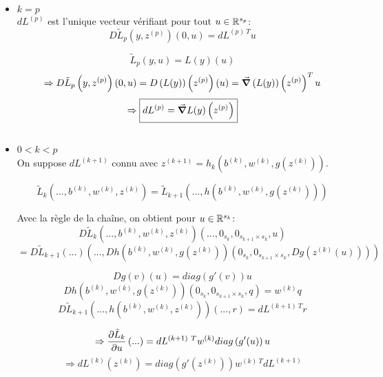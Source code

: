 	\begin{itemize}
		\item $k = p$\\
			$dL^{(p)}$ est l'unique vecteur vérifiant pour tout $u\in\mathbb{R}^{s_p}$:
			\[D\tilde{L}_p\left(y, z^{(p)}\right)(0, u) = dL^{(p)~T} u\]
			
			\[\tilde{L}_p(y, u) = L(y)(u)\]
			\[\Rightarrow D\tilde{L}_p\left(y, z^{(p)}\right)(0, u) 
				 = D\left(L(y)\right)\left(z^{(p)}\right)(u) 
				 = \grad{\left(L(y)\right)}\left(z^{(p)}\right)^T u\]
			\[\Rightarrow\boxed{dL^{(p)} = \grad{L(y)}\left(z^{(p)}\right)}\]
			
			\[\]
					
		\item $0 < k < p$\\
		On suppose $dL^{(k + 1)}$ connu avec $z^{(k+1)} = h_{k}\left(b^{(k)}, w^{(k)}, g(z^{(k)})\right)$.
		
		\[\tilde{L}_{k}\left(..., b^{(k)}, w^{(k)}, z^{(k)}\right) = \tilde{L}_{k+1}\left(..., h\left(b^{(k)}, w^{(k)}, g\left(z^{(k)}\right)\right)\right)\]
		\[\]
		
		Avec la règle de la chaîne, on obtient pour $u\in\mathbb{R}^{s_k}$:
		\[D\tilde{L}_{k}\left(
		                      ..., b^{(k)}, w^{(k)}, z^{(k)}
										\right)(..., 0_{s_k}, 0_{s_{k+1}\times s_k}, u)\] 
	  \[= D\tilde{L}_{k+1}\left(
		                        ...%
											\right)\left(
											             ..., Dh\left(
																	              b^{(k)}, w^{(k)}, g\left(z^{(k)}\right)
																					\right)
																					\left(
																					      0_{s_k}, 0_{s_{k+1}\times s_k}, Dg\left(z^{(k)}(u)\right)
																					\right)
														 \right)\]
		
		\[Dg(v)(u) = diag\left(g'(v)\right)u\]
		\[Dh\left(b^{(k)}, w^{(k)}, g\left(z^{(k)}\right)\right)(0_{s_k}, 0_{s_{k+1}\times s_k}, q) = w^{(k)}q\]
		\[D\tilde{L}_{k+1} \left(..., h\left(b^{(k)}, w^{(k)}, z^{(k)}\right)\right)(..., r) = dL^{(k+1)~T} r\]
		
		\[\Rightarrow \pdv{\tilde{L}_k}{u} \left(...\right) = dL^{(k+1)~T} w^{(k)}diag\left(g'(u)\right)u\]
		\[\Rightarrow \boxed{dL^{(k)}(z^{(k)}) = diag\left(g'(z^{(k)})\right)w^{(k)~T} dL^{(k+1)}}\]
		
	\end{itemize}


